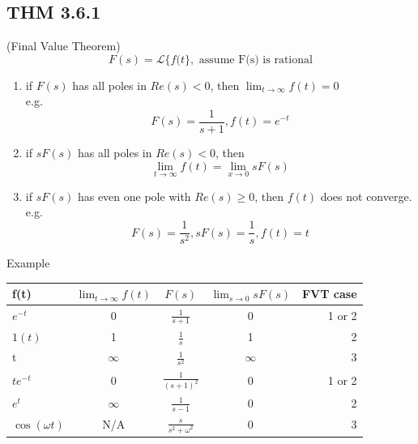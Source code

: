 \documentclass[letterpaper]{article}
\begin{document}
\subsection*{THM 3.6.1} (Final Value Theorem)
$$F(s)=\mathscr{L}\{f(t\}, \text{ assume F(s) is rational}$$
\begin{enumerate}
	\item if $F(s)$ has all poles in $Re(s)<0$, then $\lim_{t\rightarrow \infty} f(t)=0$\\
	      e.g. $$F(s)=\frac{1}{s+1},f(t)=e^{-t}$$ 
	\item if $sF(s)$ has all poles in $Re(s) < 0$, then $$\lim_{t\rightarrow \infty}f(t)=\lim_{x\rightarrow 0} sF(s)$$
	\item if $sF(s)$ has even one pole with $Re(s) \geq 0$, then $f(t)$ does not converge.\\ e.g. $$F(s)=\frac{1}{s^2}, sF(s)=\frac{1}{s},f(t)=t$$
\end{enumerate}
Example\\
\begin{center}
	\begin{tabular}{ l | c | c | c | r }
		\hline
		f(t)             & $\lim_{t\rightarrow \infty} f(t)$ & $F(s)$                   & $\lim_{s\rightarrow 0}sF(s)$ & FVT case \\ \hline
		$e^{-t}$         & 0                                 & $\frac{1}{s+1}$          & 0                            & 1 or 2   \\ \hline
		$1(t)$           & 1                                 & $\frac{1}{s}$            & 1                            & 2        \\ \hline 
		t                & $\infty$                          & $\frac{1}{s^2}$          & $\infty$                     & 3        \\ \hline 
		$te^{-t}$        & 0                                 & $\frac{1}{(s+1)^2}$      & 0                            & 1 or 2   \\ \hline 
		$e^t$            & $\infty$                          & $\frac{1}{s-1}$          & 0                            & 2        \\ \hline 
		$\cos(\omega t)$ & N/A                               & $\frac{s}{s^2+\omega^2}$ & 0                            & 3        \\ 
		\hline
	\end{tabular}
\end{center}
\end{document}
